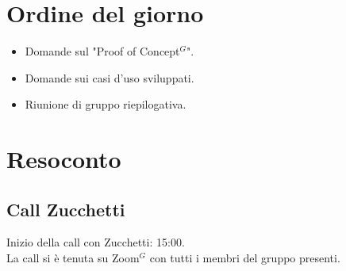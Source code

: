 \section{Ordine del giorno}

\begin{itemize}
	\item Domande sul "Proof of Concept$^{G}$".
	\item Domande sui casi d'uso sviluppati.
	\item Riunione di gruppo riepilogativa.
\end{itemize}

\section{Resoconto}
\label{sec:Resoconto}

\subsection{Call Zucchetti}
\noindent 
Inizio della call con Zucchetti: 15:00. \\
\noindent La call si è tenuta su Zoom$^{G}$ con tutti i membri del gruppo presenti.


